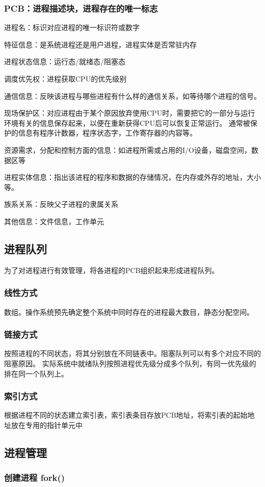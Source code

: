 \documentclass{ctexart}
\begin{document}
\subsubsection{PCB：进程描述块，进程存在的唯一标志}
\label{pcb}
进程名：标识对应进程的唯一标识符或数字

特征信息：是系统进程还是用户进程，进程实体是否常驻内存

进程状态信息：运行态/就绪态/阻塞态

调度优先权：进程获取CPU的优先级别

通信信息：反映该进程与哪些进程有什么样的通信关系，如等待哪个进程的信号。

现场保护区：对应进程由于某个原因放弃使用CPU时，需要把它的一部分与运行环境有关的信息保存起来，以便在重新获得CPU后可以恢复正常运行。
通常被保护的信息有程序计数器，程序状态字，工作寄存器的内容等。

资源需求，分配和控制方面的信息：如进程所需或占用的I/O设备，磁盘空间，数据区等

进程实体信息：指出该进程的程序和数据的存储情况，在内存或外存的地址，大小等。

族系关系：反映父子进程的隶属关系

其他信息：文件信息，工作单元

\subsection{进程队列}
为了对进程进行有效管理，将各进程的PCB组织起来形成进程队列。
\subsubsection{线性方式}
数组。操作系统预先确定整个系统中同时存在的进程最大数目，静态分配空间。
\subsubsection{链接方式}
按照进程的不同状态，将其分别放在不同链表中。阻塞队列可以有多个对应不同的阻塞原因。
实际系统中就绪队列按照进程优先级分成多个队列，有同一优先级的排在同一个队列上。
\subsubsection{索引方式}
根据进程不同的状态建立索引表，索引表条目存放PCB地址，将索引表的起始地址放在专用的指针单元中
\subsection{进程管理}
\subsubsection{创建进程 fork()}
\end{document}
